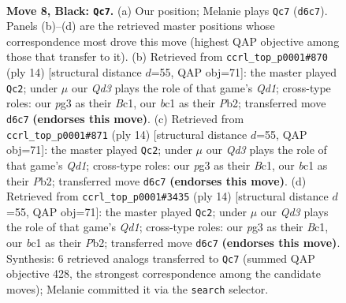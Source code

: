 \documentclass[11pt]{article}
\begin{document}
\begin{figure}[p]\centering
\begin{subfigure}{0.46\textwidth}\centering
\resizebox{\linewidth}{!}{%
\newchessgame
\chessboard[
  setfen={rnb2rk1/pp2bppp/3qpn2/2pp4/4P2P/3P1NP1/PPPN1PB1/R1BQ1RK1 b - - 0 8},
  showmover=false,
  pgfstyle=straightmove, color=movearrow, markmove={d6-c7}
]}
\caption{}
\end{subfigure}\hfill
\begin{subfigure}{0.46\textwidth}\centering
\resizebox{\linewidth}{!}{%
\newchessgame
\chessboard[
  setfen={r1bq1rk1/pppn1pbp/3p1np1/4p3/2PP4/2N2NP1/PP2PPBP/R1BQ1RK1 w - - 3 8},
  showmover=false,
  pgfstyle=straightmove, color=movearrow, markmove={d1-c2}
]}
\caption{}
\end{subfigure}
\\[4pt]
\begin{subfigure}{0.46\textwidth}\centering
\resizebox{\linewidth}{!}{%
\newchessgame
\chessboard[
  setfen={r1bq1rk1/pppn1pbp/3p1np1/4p3/2PP4/2N2NP1/PP2PPBP/R1BQ1RK1 w - - 3 8},
  showmover=false,
  pgfstyle=straightmove, color=movearrow, markmove={d1-c2}
]}
\caption{}
\end{subfigure}\hfill
\begin{subfigure}{0.46\textwidth}\centering
\resizebox{\linewidth}{!}{%
\newchessgame
\chessboard[
  setfen={r1bq1rk1/pppn1pbp/3p1np1/4p3/2PP4/2N2NP1/PP2PPBP/R1BQ1RK1 w - - 0 8},
  showmover=false,
  pgfstyle=straightmove, color=movearrow, markmove={d1-c2}
]}
\caption{}
\end{subfigure}
\caption{\textbf{Move 8, Black: \texttt{Qc7}.} (a) Our position; Melanie plays \texttt{Qc7} (\texttt{d6c7}). Panels (b)--(d) are the retrieved master positions whose correspondence most drove this move (highest QAP objective among those that transfer to it). (b) Retrieved from \texttt{ccrl\_top\_p0001\#870} (ply 14) [structural distance $d$=55, QAP obj=71]: the master played \texttt{Qc2}; under $\mu$ our \emph{Qd3} plays the role of that game's \emph{Qd1}; cross-type roles: our \emph{p}g3 as their \emph{B}c1, our \emph{b}c1 as their \emph{P}b2; transferred move \texttt{d6c7} \textbf{(endorses this move)}. (c) Retrieved from \texttt{ccrl\_top\_p0001\#871} (ply 14) [structural distance $d$=55, QAP obj=71]: the master played \texttt{Qc2}; under $\mu$ our \emph{Qd3} plays the role of that game's \emph{Qd1}; cross-type roles: our \emph{p}g3 as their \emph{B}c1, our \emph{b}c1 as their \emph{P}b2; transferred move \texttt{d6c7} \textbf{(endorses this move)}. (d) Retrieved from \texttt{ccrl\_top\_p0001\#3435} (ply 14) [structural distance $d$=55, QAP obj=71]: the master played \texttt{Qc2}; under $\mu$ our \emph{Qd3} plays the role of that game's \emph{Qd1}; cross-type roles: our \emph{p}g3 as their \emph{B}c1, our \emph{b}c1 as their \emph{P}b2; transferred move \texttt{d6c7} \textbf{(endorses this move)}. Synthesis: 6 retrieved analogs transferred to \texttt{Qc7} (summed QAP objective 428, the strongest correspondence among the candidate moves); Melanie committed it via the \texttt{search} selector.}
\label{fig:thought-m15}
\end{figure}
\end{document}
